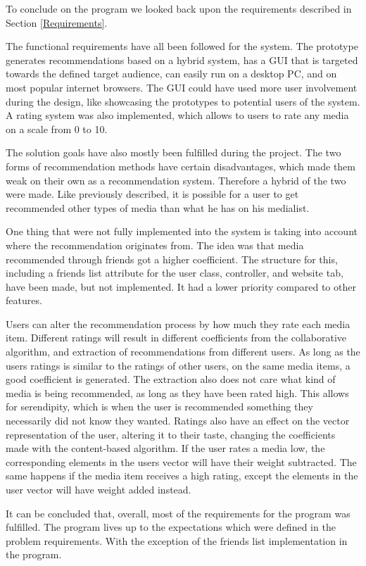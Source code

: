 To conclude on the program we looked back upon the requirements described in Section \ref{Requirements}.

The functional requirements have all been followed for the system. The prototype generates recommendations based on a hybrid system, has a GUI that is targeted towards the defined target audience, can easily run on a desktop PC, and on most popular internet browsers. The GUI could have used more user involvement during the design, like showcasing the prototypes to potential users of the system. A rating system was also implemented, which allows to users to rate any media on a scale from 0 to 10.

The solution goals have also mostly been fulfilled during the project. The two forms of recommendation methods have certain disadvantages, which made them weak on their own as a recommendation system. Therefore a hybrid of the two were made. Like previously described, it is possible for a user to get recommended other types of media than what he has on his medialist. 

One thing that were not fully implemented into the system is taking into account where the recommendation originates from. The idea was that media recommended through friends got a higher coefficient. The structure for this, including a friends list attribute for the user class, controller, and website tab, have been made, but not implemented. It had a lower priority compared to other features. 

Users can alter the recommendation process by how much they rate each media item. Different ratings will result in different coefficients from the collaborative algorithm, and extraction of recommendations from different users. As long as the users ratings is similar to the ratings of other users, on the same media items, a good coefficient is generated. The extraction also does not care what kind of media is being recommended, as long as they have been rated high. This allows for serendipity, which is when the user is recommended something they necessarily did not know they wanted. Ratings also have an effect on the vector representation of the user, altering it to their taste, changing the coefficients made with the content-based algorithm. If the user rates a media low, the corresponding elements in the users vector will have their weight subtracted. The same happens if the media item receives a high rating, except the elements in the user vector will have weight added instead.

It can be concluded that, overall, most of the requirements for the program was fulfilled. The program lives up to the expectations which were defined in the problem requirements. With the exception of the friends list implementation in the program.